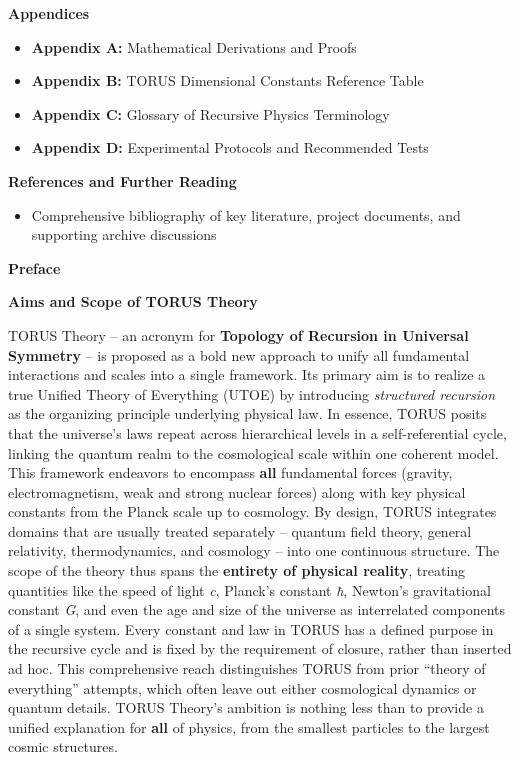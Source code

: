 \documentclass[
]{article}
\begin{document}
\textbf{Appendices}

\begin{itemize}
\item
  \textbf{Appendix A:} Mathematical Derivations and Proofs
\item
  \textbf{Appendix B:} TORUS Dimensional Constants Reference Table
\item
  \textbf{Appendix C:} Glossary of Recursive Physics Terminology
\item
  \textbf{Appendix D:} Experimental Protocols and Recommended Tests
\end{itemize}

\textbf{References and Further Reading}

\begin{itemize}
\item
  Comprehensive bibliography of key literature, project documents, and
  supporting archive discussions
\end{itemize}

\textbf{Preface}

\textbf{Aims and Scope of TORUS Theory}

TORUS Theory -- an acronym for \textbf{Topology of Recursion in
Universal Symmetry} -- is proposed as a bold new approach to unify all
fundamental interactions and scales into a single framework. Its primary
aim is to realize a true Unified Theory of Everything (UTOE) by
introducing \emph{structured recursion} as the organizing principle
underlying physical law. In essence, TORUS posits that the universe's
laws repeat across hierarchical levels in a self-referential cycle,
linking the quantum realm to the cosmological scale within one coherent
model. This framework endeavors to encompass \textbf{all} fundamental
forces (gravity, electromagnetism, weak and strong nuclear forces) along
with key physical constants from the Planck scale up to
cosmology\hspace{0pt}. By design, TORUS integrates domains that are
usually treated separately -- quantum field theory, general relativity,
thermodynamics, and cosmology -- into one continuous structure. The
scope of the theory thus spans the \textbf{entirety of physical
reality}, treating quantities like the speed of light \emph{c}, Planck's
constant \emph{ħ}, Newton's gravitational constant \emph{G}, and even
the age and size of the universe as interrelated components of a single
system. Every constant and law in TORUS has a defined purpose in the
recursive cycle and is fixed by the requirement of closure, rather than
inserted ad hoc\hspace{0pt}. This comprehensive reach distinguishes
TORUS from prior ``theory of everything'' attempts, which often leave
out either cosmological dynamics or quantum details. TORUS Theory's
ambition is nothing less than to provide a unified explanation for
\textbf{all} of physics, from the smallest particles to the largest
cosmic structures\hspace{0pt}.
\end{document}
